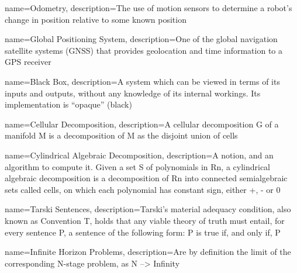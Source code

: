 {
    name=Odometry,
    description={The use of motion sensors to determine a robot's change in position relative to some known position \cite{robo-rats_locomotion_odometry}}
}

{
    name=Global Positioning System,
    description={One of the global navigation satellite systems (GNSS) that provides geolocation and time information to a GPS receiver \cite{global_positioning_system}}
}

{
    name=Black Box,
    description={A system which can be viewed in terms of its inputs and outputs, without any knowledge of its internal workings. Its implementation is ``opaque'' (black) \cite{a_general_black_box_theory}}
}

{
    name=Cellular Decomposition,
    description={A cellular decomposition G of a manifold M is a decomposition of M as the disjoint union of cells \cite{decompositions_of_manifolds}}
}

{
    name=Cylindrical Algebraic Decomposition,
    description={A notion, and an algorithm to compute it. Given a set S of polynomials in Rn, a cylindrical algebraic decomposition is a decomposition of Rn into connected semialgebraic sets called cells, on which each polynomial has constant sign, either +, - or 0 \cite{cylindrical_algebraic_decompostion}}
}

{
    name=Tarski Sentences,
    description={Tarski's material adequacy condition, also known as Convention T, holds that any viable theory of truth must entail, for every sentence P, a sentence of the following form: P is true if, and only if, P \cite{a_companion_to_the_philosophy_of_language}}
}

{
    name=Infinite Horizon Problems,
    description={Are by definition the limit of the corresponding N-stage problem, as N --> Infinity \cite{infinite_horizon_problems}}
}


